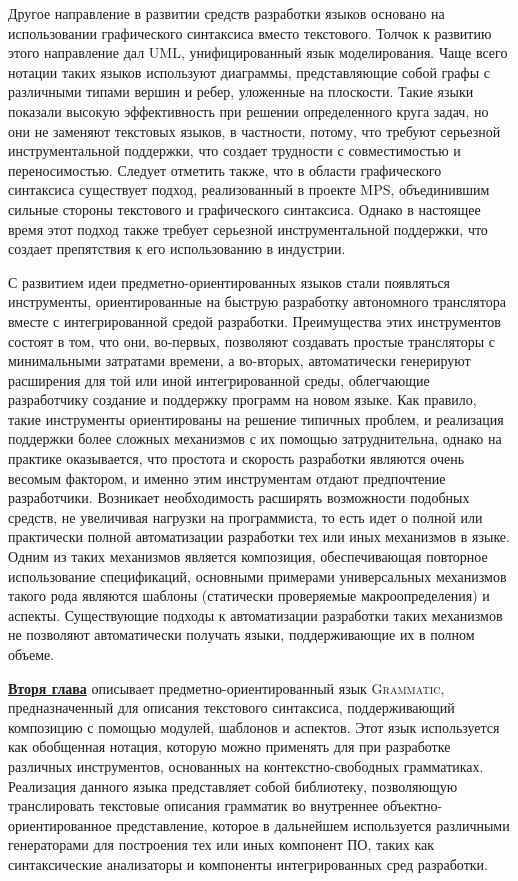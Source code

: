 \documentclass[12pt,a4paper]{article}
\newcommand{\tool}[1]{\textsc{#1}}
\theoremstyle{definition}
\theoremstyle{plain}
\newcommand{\afsubsection}[1]{\par \textbf{\underline{#1}}}
\begin{document}
Другое направление в развитии средств разработки языков основано на использовании графического синтаксиса вместо текстового. Толчок к развитию этого направление дал UML, унифицированный язык моделирования. Чаще всего нотации таких языков используют диаграммы, представляющие собой графы с различными типами вершин и ребер, уложенные на плоскости. Такие языки показали высокую эффективность при решении определенного круга задач, но они не заменяют текстовых языков, в частности, потому, что требуют серьезной инструментальной поддержки, что создает трудности с совместимостью и переносимостью. Следует отметить также, что в области графического синтаксиса существует подход, реализованный в проекте \tool{MPS}, объединившим сильные стороны текстового и графического синтаксиса. Однако в настоящее время этот подход также требует серьезной инструментальной поддержки, что создает препятствия к его использованию в индустрии.

С развитием идеи предметно-ориентированных языков стали появляться инструменты, ориентированные на быструю разработку автономного транслятора вместе с интегрированной средой разработки. Преимущества этих инструментов состоят в том, что они, во-первых, позволяют создавать простые трансляторы с минимальными затратами времени, а во-вторых, автоматически генерируют расширения для той или иной интегрированной среды, облегчающие разработчику создание и поддержку программ на новом языке. Как правило, такие инструменты ориентированы на решение типичных проблем, и реализация поддержки более сложных механизмов с их помощью затруднительна, однако на практике оказывается, что простота и скорость разработки являются очень весомым фактором, и именно этим инструментам отдают предпочтение разработчики. Возникает необходимость расширять возможности подобных средств, не увеличивая нагрузки на программиста, то есть идет о полной или практически полной автоматизации разработки тех или иных механизмов в языке. Одним из таких механизмов является композиция, обеспечивающая повторное использование спецификаций, основными примерами универсальных механизмов такого рода являются шаблоны (статически проверяемые макроопределения) и аспекты. Существующие подходы к автоматизации разработки таких механизмов не позволяют автоматически получать языки, поддерживающие их в полном объеме.

\afsubsection{Вторя глава} описывает предметно-ориентированный язык \tool{Grammatic}, предназначенный для описания текстового синтаксиса, поддерживающий композицию с помощью модулей, шаблонов и аспектов. Этот язык используется как обобщенная нотация, которую можно применять для при разработке различных инструментов, основанных на контекстно-свободных грамматиках. Реализация данного языка представляет собой библиотеку, позволяющую транслировать текстовые описания грамматик во внутреннее объектно-ориентированное представление, которое в дальнейшем используется различными генераторами для построения тех или иных компонент ПО, таких как синтаксические анализаторы и компоненты интегрированных сред разработки.
\end{document}
